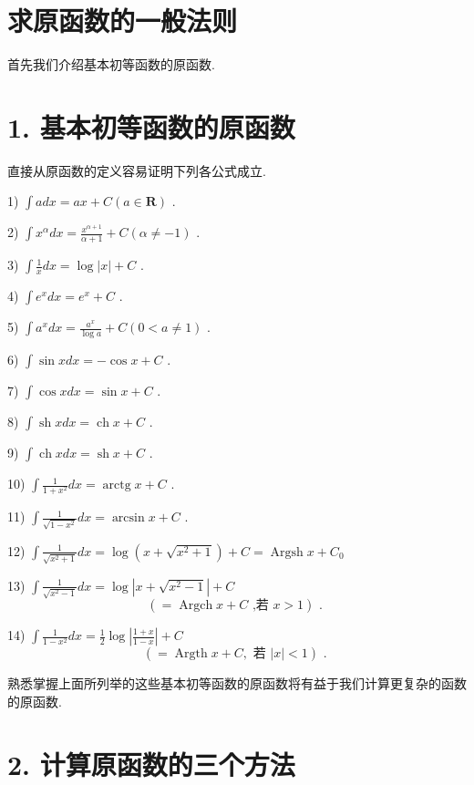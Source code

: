 \section{求原函数的一般法则}

首先我们介绍基本初等函数的原函数.

\section*{1. 基本初等函数的原函数}

直接从原函数的定义容易证明下列各公式成立.

1) $\int {adx} = {ax} + C\left( {a \in  \mathbf{R}}\right)$ .

2) $\int {x}^{\alpha }{dx} = \frac{{x}^{\alpha  + 1}}{\alpha  + 1} + C\left( {\alpha  \neq   - 1}\right)$ .

3) $\int \frac{1}{x}{dx} = \log \left| x\right|  + C$ .

4) $\int {e}^{x}{dx} = {e}^{x} + C$ .

5) $\int {a}^{x}{dx} = \frac{{a}^{x}}{\log a} + C\left( {0 < a \neq  1}\right)$ .

6) $\int \sin {xdx} =  - \cos x + C$ .

7) $\int \cos {xdx} = \sin x + C$ .

8) $\int \operatorname{sh}{xdx} = \operatorname{ch}x + C$ .

9) $\int \operatorname{ch}{xdx} = \operatorname{sh}x + C$ .

10) $\int \frac{1}{1 + {x}^{2}}{dx} = \operatorname{arctg}x + C$ .

11) $\int \frac{1}{\sqrt{1 - {x}^{2}}}{dx} = \arcsin x + C$ .

12) $\int \frac{1}{\sqrt{{x}^{2} + 1}}{dx} = \log \left( {x + \sqrt{{x}^{2} + 1}}\right)  + C = \operatorname{Argsh}x + {C}_{0}$

13) $\int \frac{1}{\sqrt{{x}^{2} - 1}}{dx} = \log \left| {x + \sqrt{{x}^{2} - 1}}\right|  + C$
$$\left( { = \operatorname{Argch}x + C\text{ ,若 }x > 1}\right) \text{ . }$$

14) $\int \frac{1}{1 - {x}^{2}}{dx} = \frac{1}{2}\log \left| \frac{1 + x}{1 - x}\right|  + C$
$$\left( { = \operatorname{Argth}x + C,\text{ 若 }\left| x\right|  < 1}\right) \text{ . }$$

熟悉掌握上面所列举的这些基本初等函数的原函数将有益于我们计算更复杂的函数的原函数.

\section*{2. 计算原函数的三个方法}

